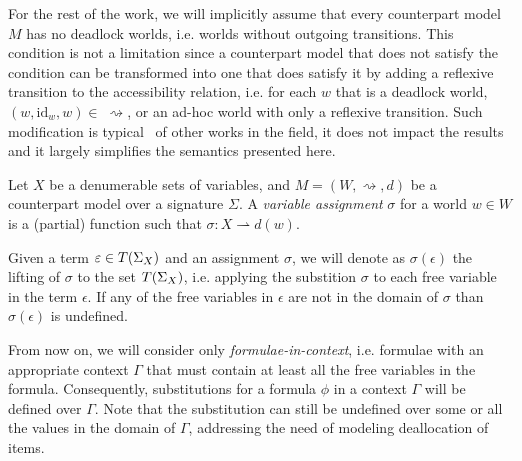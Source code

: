 For the rest of the work, we will implicitly assume that every counterpart model $M$ has no deadlock worlds, i.e.
worlds without outgoing transitions. This condition is not a limitation since a counterpart model that does not satisfy
the condition can be transformed into one that does satisfy it by adding a reflexive transition to the accessibility
relation, i.e. for each $w$ that is a deadlock world, $(w, \text{id}_w, w) \in\;\rightsquigarrow$, or an ad-hoc world
with only a reflexive transition. Such modification is typical~\cite{baier_principles_2008} of other works in the field,
it does not impact the results and it largely simplifies the semantics presented here.

\begin{definition}
  Let $X$ be a denumerable sets of variables, and $M = (W, \rightsquigarrow, d)$ be a counterpart model over a signature
  $\Sigma$. A \emph{variable assignment} $\sigma$ for a world $w \in W$ is a (partial) function such that $\sigma : X
  \rightharpoonup d(w)$.
\end{definition}

Given a term $\varepsilon \in T({\Sigma}_{X})$ and an assignment $\sigma$, we will denote as
$\sigma(\epsilon)$ the lifting of $\sigma$ to the set $T({\Sigma}_{X})$, i.e. applying the substition $\sigma$ to each
free variable in the term $\epsilon$. If any of the free variables in $\epsilon$ are not in the domain of $\sigma$ than $\sigma(\epsilon)$ is undefined.

From now on, we will consider only \emph{formulae-in-context}, i.e. formulae with an appropriate context $\Gamma$ that
must contain at least all the free variables in the formula. Consequently, substitutions for a formula $\phi$ in a
context $\Gamma$ will be defined over $\Gamma$. Note that the substitution can still be undefined over some
or all the values in the domain of $\Gamma$, addressing the need of modeling deallocation of items.
